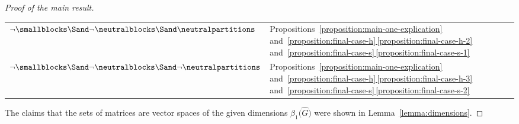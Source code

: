 \documentclass[pdftex]{sigma}
\numberwithin{equation}{section}
\begin{document}
\begin{proof}[Proof of the main result]
\begin{table}[h!]
\begin{tabular}{l|l}
    $\neg\smallblocks \Sand\neg\neutralblocks\Sand \neutralpartitions$ & Pro\-po\-si\-tions~\ref{proposition:main-one-explication} and~\hyperref[proposition:final-case-h-2]{\ref*{proposition:final-case-h}\,\ref*{proposition:final-case-h-2}} and~\hyperref[proposition:final-case-s-1]{\ref*{proposition:final-case-s}\,\ref*{proposition:final-case-s-1}}\\
$\neg\smallblocks \Sand\neg\neutralblocks\Sand \neg\neutralpartitions$ & Pro\-po\-si\-tions~\ref{proposition:main-one-explication} and~\hyperref[proposition:final-case-h-3]{\ref*{proposition:final-case-h}\,\ref*{proposition:final-case-h-3}} and~\hyperref[proposition:final-case-s-2]{\ref*{proposition:final-case-s}\,\ref*{proposition:final-case-s-2}}
  \end{tabular}
\end{table}

  The claims that the sets of matrices are vector spaces of the given dimensions $\beta_1\bigl(\widehat{G}\bigr)$ were shown in Lem\-ma~\ref{lemma:dimensions}.
    \end{proof}
\end{document}
